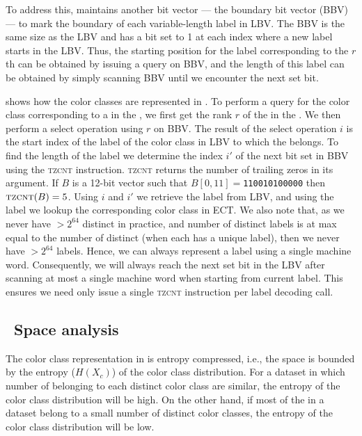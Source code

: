 To address this, \system maintains another bit vector --- the boundary bit
vector (BBV) --- to mark the boundary of each variable-length label in LBV. The
BBV is the same size as the LBV and has a bit set
to 1 at each index where a new label starts in the LBV. Thus, the starting
position for the label corresponding to the $r$th \kmer can be obtained by
issuing a  query on BBV, and the length of this label can be
obtained by simply scanning BBV until we encounter the next set bit.

 shows how the color classes are represented in \system. To
perform a query for the color class corresponding to a \kmer in the \cdbg, we
first get the rank $r$ of the \kmer in the \dbg. We then perform a select
operation using $r$ on BBV. The result of the select operation $i$ is the start
index of the label of the color class in LBV to which the \kmer belongs.
%
To find the length of the label we determine the index $i'$ of the next bit set
in BBV using the \textsc{tzcnt} instruction.
%
\textsc{tzcnt} returns the number of trailing zeros in its argument. If $B$ is a
12-bit vector such that $B[0,11]=$\texttt{110010100000} then
$\textsc{tzcnt}(B)=5$.
%
%
Using $i$ and $i'$ we retrieve the label from LBV, and using
the label we lookup the corresponding color class in ECT.
%
We also note that, as we never have $> 2^{64}$ distinct \kmers in practice, and
number of distinct labels is at max equal to the number of distinct \kmers (when
each \kmer has a unique label), then we never have $> 2^{64}$ labels. Hence, we can
always represent a label using a single machine word. Consequently, we will
always reach the next set bit in the LBV after scanning at most a single machine
word when starting from current label. This ensures we need only issue a single
\textsc{tzcnt} instruction per label decoding call.


\subsection{~Space analysis}
\label{system-space-bound}

The color class representation in \system is entropy compressed, i.e.,
the space is bounded by the entropy ($H(X_c)$) of the color class distribution. 
For a dataset in which number of \kmers belonging to each distinct color class are
similar, the entropy of the color class distribution will be high. On the other
hand, if most of the \kmers in a dataset belong to a small number of distinct
color classes, the entropy of the color class distribution will be low.

